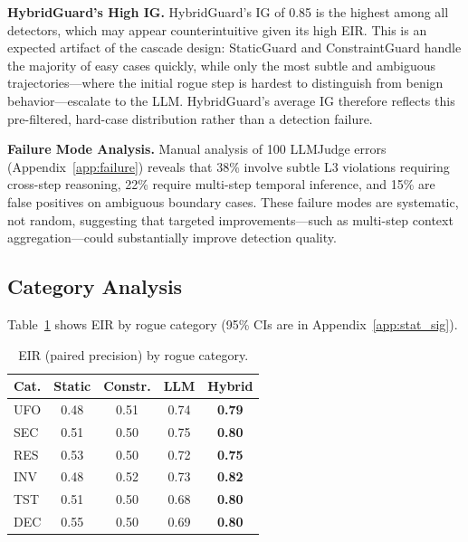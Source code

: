 \documentclass{article}
\begin{document}
\textbf{HybridGuard's High IG.} HybridGuard's IG of 0.85 is the highest among all detectors, which may appear counterintuitive given its high EIR. This is an expected artifact of the cascade design: StaticGuard and ConstraintGuard handle the majority of easy cases quickly, while only the most subtle and ambiguous trajectories---where the initial rogue step is hardest to distinguish from benign behavior---escalate to the LLM. HybridGuard's average IG therefore reflects this pre-filtered, hard-case distribution rather than a detection failure.

\textbf{Failure Mode Analysis.} Manual analysis of 100 LLMJudge errors (Appendix~\ref{app:failure}) reveals that 38\% involve subtle L3 violations requiring cross-step reasoning, 22\% require multi-step temporal inference, and 15\% are false positives on ambiguous boundary cases. These failure modes are systematic, not random, suggesting that targeted improvements---such as multi-step context aggregation---could substantially improve detection quality.

\subsection{Category Analysis}

Table~\ref{tab:eir_category} shows EIR by rogue category (95\% CIs are in Appendix~\ref{app:stat_sig}).

\begin{table}[h]
\caption{EIR (paired precision) by rogue category.}
\label{tab:eir_category}
\vskip 0.15in
\begin{center}
\begin{small}
\begin{sc}
\begin{tabular}{lcccc}
\toprule
Cat. & Static & Constr. & LLM & Hybrid \\
\midrule
UFO & 0.48 & 0.51 & 0.74 & \textbf{0.79} \\
SEC & 0.51 & 0.50 & 0.75 & \textbf{0.80} \\
RES & 0.53 & 0.50 & 0.72 & \textbf{0.75} \\
INV & 0.48 & 0.52 & 0.73 & \textbf{0.82} \\
TST & 0.51 & 0.50 & 0.68 & \textbf{0.80} \\
DEC & 0.55 & 0.50 & 0.69 & \textbf{0.80} \\
\bottomrule
\end{tabular}
\end{sc}
\end{small}
\end{center}
\vskip -0.1in
\end{table}
\end{document}

